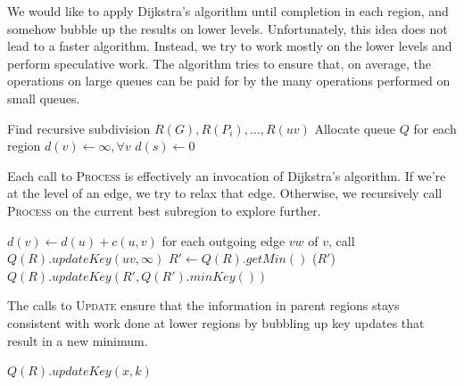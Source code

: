 \documentclass[11pt]{article}
\begin{document}
We would like to apply Dijkstra's algorithm until completion in each region, and somehow bubble up the results on lower levels. Unfortunately, this idea does not lead to a faster algorithm. Instead, we try to work mostly on the lower levels and perform speculative work. The algorithm tries to ensure that, on average, the operations on large queues can be paid for by the many operations performed on small queues.

\begin{algorithm}
  \label{alg:linear}
  \begin{algorithmic}[1]
    \State Find recursive subdivision $R(G), R(P_i), \ldots, R(uv)$
    \State Allocate queue $Q$ for each region
    \State $d(v) \gets \infty, \forall v$
    \State $d(s) \gets 0$
      \State {}
    \EndFor
      \State {}
    \EndWhile
  \end{algorithmic}
\end{algorithm}

Each call to \textsc{Process} is effectively an invocation of Dijkstra's algorithm. If we're at the level of an edge, we try to relax that edge. Otherwise, we recursively call \textsc{Process} on the current best subregion to explore further.

\begin{algorithm}[!h]
  \label{alg:process}
  \begin{algorithmic}[1]
          \State $d(v) \gets d(u) + c(u,v)$
          \State for each outgoing edge $vw$ of $v$, call 
        \EndIf
        \State $Q(R).updateKey(uv,\infty)$
      \Else
        \Repeat
          \State $R' \gets Q(R).getMin()$
          \State {}($R'$)
          \State $Q(R).updateKey(R',Q(R').minKey())$
      \EndIf
    \EndProcedure
  \end{algorithmic}
\end{algorithm}

The calls to \textsc{Update} ensure that the information in parent regions stays consistent with work done at lower regions by bubbling up key updates that result in a new minimum.

\begin{algorithm}[!h]
  \label{alg:update}
  \begin{algorithmic}[1]
      \State $Q(R).updateKey(x,k)$
        \State {}
      \EndIf
    \EndProcedure
  \end{algorithmic}
\end{algorithm}
\end{document}
